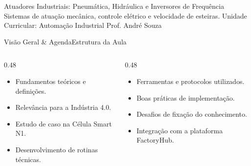
\senaicover
  {Atuadores Industriais: Pneumática, Hidráulica e Inversores de Frequência}
  {Sistemas de atuação mecânica, controle elétrico e velocidade de esteiras.}
  {Unidade Curricular: Automação Industrial}
  {Prof. André Souza}

\begin{senaiframe}{Visão Geral \& Agenda}{Estrutura da Aula}
  \begin{columns}[t]
    \begin{column}{0.48\textwidth}
      \begin{tcolorbox}[senaibluecard, title={1. Conceitos Chave}]
        \begin{itemize}
          \item Fundamentos teóricos e definições.
          \item Relevância para a Indústria 4.0.
        \end{itemize}
      \end{tcolorbox}
      \vspace{4pt}
      \begin{tcolorbox}[senaiambercard, title={3. Aplicação Prática}]
        \begin{itemize}
          \item Estudo de caso na Célula Smart N1.
          \item Desenvolvimento de rotinas técnicas.
        \end{itemize}
      \end{tcolorbox}
    \end{column}
    \begin{column}{0.48\textwidth}
      \begin{tcolorbox}[senairedcard, title={2. Detalhamento Técnico}]
        \begin{itemize}
          \item Ferramentas e protocolos utilizados.
          \item Boas práticas de implementação.
        \end{itemize}
      \end{tcolorbox}
      \vspace{4pt}
      \begin{tcolorbox}[senaigreencard, title={4. Exercícios \& Avaliação}]
        \begin{itemize}
          \item Desafios de fixação do conhecimento.
          \item Integração com a plataforma FactoryHub.
        \end{itemize}
      \end{tcolorbox}
    \end{column}
  \end{columns}
\end{senaiframe}


